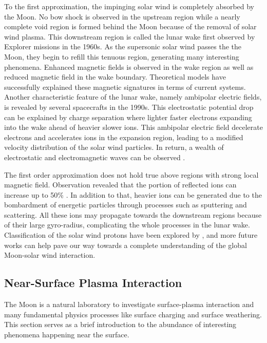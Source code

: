 To the first approximation, the impinging solar wind is completely absorbed by the Moon. No bow shock is observed in the upstream region \citep{nessEarlyResultsMagnetic1967} while a nearly complete void region is formed behind the Moon because of the removal of solar wind plasma. This downstream region is called the lunar wake first observed by Explorer missions in the 1960s. As the supersonic solar wind passes the the Moon, they begin to refill this tenuous region, generating many interesting phenomena. Enhanced magnetic fields is observed in the wake region as well as reduced magnetic field in the wake boundary. Theoretical models \citep{whangTheoreticalStudyMagnetic1968} have successfully explained these magnetic signatures in terms of current systems. Another characteristic feature of the lunar wake, namely ambipolar electric fields, is revealed by several spacecrafts in the 1990s. This electrostatic potential drop can be explained by charge separation where lighter faster electrons expanding into the wake ahead of heavier slower ions. This ambipolar electric field decelerate electrons and accelerates ions in the expansion region, leading to a modified velocity distribution of the solar wind particles. In return, a wealth of electrostatic and electromagnetic waves can be observed \citep{nakagawaGEOTAILObservationUpstream2003}.

The first order approximation does not hold true above regions with strong local magnetic field. Observation revealed that the portion of reflected ions can increase up to 50\% \citep{lueStrongInfluenceLunar2011}. In addition to that, heavier ions can be generated due to the bombardment of energetic particles through processes such as sputtering and scattering. All these ions may propagate towards the downstream regions because of their large gyro-radius, complicating the whole processes in the lunar wake. Classification of the solar wind protons have been explored by \cite{nishinoSolarwindProtonAccess2009}, and more future works can help pave our way towards a complete understanding of the global Moon-solar wind interaction.


\subsection{Near-Surface Plasma Interaction}

The Moon is a natural laboratory to investigate surface-plasma interaction and many fundamental physics processes like surface charging and surface weathering. This section serves as a brief introduction to the abundance of interesting phenomena happening near the surface.

